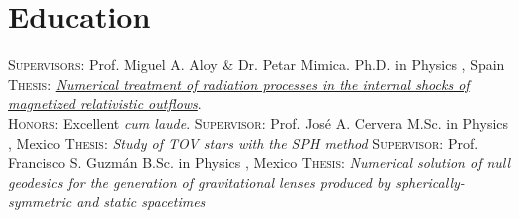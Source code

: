 \section{Education}

%
{\textsc{Supervisors}: Prof. Miguel A. Aloy \& Dr. Petar Mimica.}%
{Ph.D. in Physics \textnormal{}}%
{\UVval, Spain}%
{}%
{\textsc{Thesis}: \href{http://roderic.uv.es/handle/10550/60003}{\textit{Numerical treatment of radiation processes in the internal shocks of magnetized relativistic outflows}}.\\%
  \textsc{Honors}: Excellent \textit{cum laude}.
}
%
{\textsc{Supervisor}: Prof. José A. Cervera}%
{M.Sc. in Physics}%
{\UMSNHes, Mexico}%
{}%
{\textsc{Thesis}: \textit{Study of TOV stars with the SPH method}}
%
{\textsc{Supervisor}: Prof. Francisco S. Guzmán}%
{B.Sc. in Physics}%
{\UAEMes, Mexico}
{}%
{\textsc{Thesis}: \textit{Numerical solution of null geodesics for the generation of gravitational lenses produced by spherically-symmetric and static spacetimes}}
